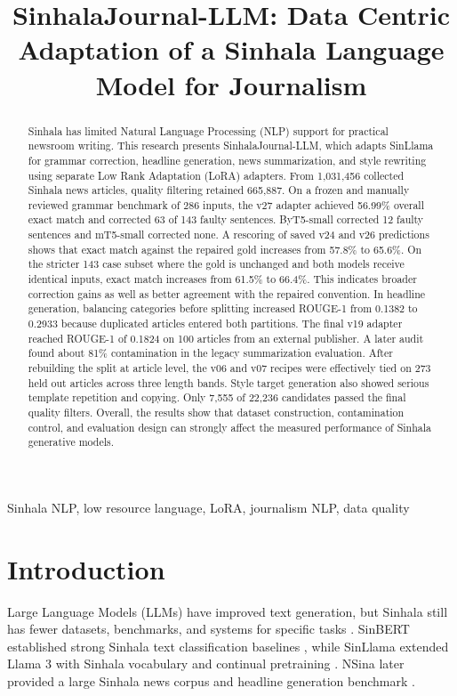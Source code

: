 \documentclass[a4paper,conference]{IEEEtran}
\begin{document}
\title{SinhalaJournal-LLM: Data Centric Adaptation of a Sinhala Language Model for Journalism}
\newcommand{\systemname}{SinhalaJournal-LLM}

\author{}

\maketitle

\begin{abstract}
Sinhala has limited Natural Language Processing (NLP) support for practical
newsroom writing. This research presents \systemname, which adapts SinLlama
for grammar correction, headline generation, news summarization, and style
rewriting using separate Low Rank Adaptation (LoRA) adapters. From 1,031,456
collected Sinhala news articles, quality filtering retained 665,887. On a
frozen and manually reviewed grammar benchmark of 286 inputs, the v27 adapter
achieved 56.99\% overall exact match and corrected 63 of 143 faulty sentences.
ByT5-small corrected 12 faulty sentences and mT5-small corrected none. A
rescoring of saved v24 and v26 predictions shows that exact match against the
repaired gold increases from 57.8\% to 65.6\%. On the stricter 143 case subset
where the gold is unchanged and both models receive identical inputs, exact
match increases from 61.5\% to 66.4\%. This indicates broader correction gains
as well as better agreement with the repaired convention. In headline
generation, balancing categories before splitting increased ROUGE-1 from
0.1382 to 0.2933 because duplicated articles entered both partitions. The
final v19 adapter reached ROUGE-1 of 0.1824 on 100 articles from an external
publisher. A later audit found about 81\% contamination in the legacy
summarization evaluation. After rebuilding the split at article level, the v06
and v07 recipes were effectively tied on 273 held out articles across three
length bands. Style target generation also showed serious template repetition
and copying. Only 7,555 of 22,236 candidates passed the final quality filters.
Overall, the results show that dataset construction, contamination control, and
evaluation design can strongly affect the measured performance of Sinhala
generative models.
\end{abstract}

\begin{IEEEkeywords}
Sinhala NLP, low resource language, LoRA, journalism NLP, data quality
\end{IEEEkeywords}

\section{Introduction}
Large Language Models (LLMs) have improved text generation, but Sinhala still has
fewer datasets, benchmarks, and systems for specific tasks
\cite{desilva2019survey,jayakody2024performance}. SinBERT established strong
Sinhala text classification baselines \cite{dhananjaya2022bertifying}, while
SinLlama extended Llama 3 with Sinhala vocabulary and continual pretraining
\cite{grattafiori2024llama3,aravinda2025sinllama}. NSina later provided a large
Sinhala news corpus and headline generation benchmark
\cite{hettiarachchi2024nsina}.
\end{document}
